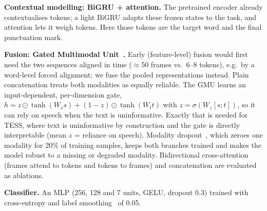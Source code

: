 \textbf{Contextual modelling: BiGRU + attention.} The pretrained encoder already contextualises tokens; a light BiGRU adapts these frozen states to the task, and attention lets it weigh tokens.
Here those tokens are the target word and the final punctuation mark.

\textbf{Fusion: Gated Multimodal Unit~\cite{gmu}.} Early (feature-level) fusion would first need the two sequences aligned in time ($\approx$50 frames vs.\ 6--8 tokens), e.g.\ by a word-level forced alignment; we fuse the pooled representations instead.
Plain concatenation treats both modalities as equally reliable.
The GMU learns an input-dependent, per-dimension gate, $h=z\odot\tanh(W_s s)+(1-z)\odot\tanh(W_t t)$ with $z=\sigma(W_z[s;t])$, so it can rely on speech when the text is uninformative.
Exactly that is needed for TESS, where text is uninformative by construction and the gate is directly interpretable (mean $z$ = reliance on speech).
Modality dropout~\cite{moddrop}, which zeroes one modality for 20\% of training samples, keeps both branches trained and makes the model robust to a missing or degraded modality.
Bidirectional cross-attention~\cite{mult} (frames attend to tokens and tokens to frames) and concatenation are evaluated as ablations.

\textbf{Classifier.} An MLP (256, 128 and 7 units, GELU, dropout 0.3) trained with cross-entropy and label smoothing~\cite{labelsmooth} of 0.05.

